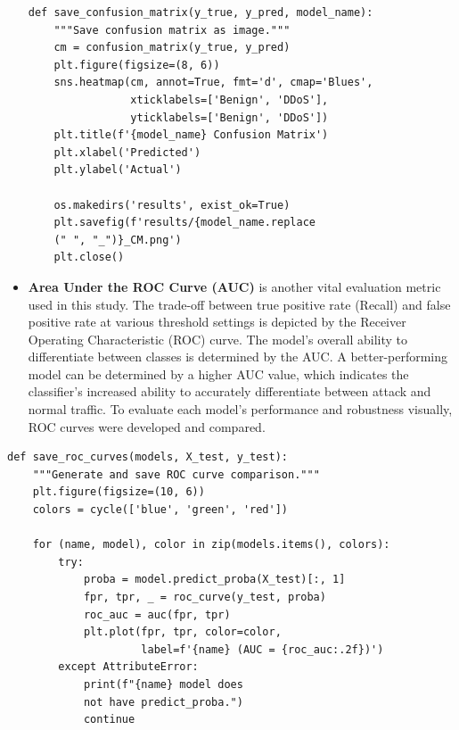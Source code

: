 \documentclass[conference]{IEEEtran}
\begin{document}
\begin{itemize}
\begin{center}
\begin{scriptsize}
\begin{verbatim}
def save_confusion_matrix(y_true, y_pred, model_name):
    """Save confusion matrix as image."""
    cm = confusion_matrix(y_true, y_pred)
    plt.figure(figsize=(8, 6))
    sns.heatmap(cm, annot=True, fmt='d', cmap='Blues',
                xticklabels=['Benign', 'DDoS'],
                yticklabels=['Benign', 'DDoS'])
    plt.title(f'{model_name} Confusion Matrix')
    plt.xlabel('Predicted')
    plt.ylabel('Actual')

    os.makedirs('results', exist_ok=True)
    plt.savefig(f'results/{model_name.replace
    (" ", "_")}_CM.png')
    plt.close()
\end{verbatim}
\end{scriptsize}
\end{center}


    \item \textbf{Area Under the ROC Curve (AUC)} is another vital evaluation metric used in this study. The trade-off between true positive rate (Recall) and false positive rate at various threshold settings is depicted by the Receiver Operating Characteristic (ROC) curve. The model's overall ability to differentiate between classes is determined by the AUC. A better-performing model can be determined by a higher AUC value, which indicates the classifier's increased ability to accurately differentiate between attack and normal traffic. To evaluate each model's performance and robustness visually, ROC curves were developed and compared.


\end{itemize}
    
\begin{center}
\begin{scriptsize}
\begin{verbatim}
def save_roc_curves(models, X_test, y_test):
    """Generate and save ROC curve comparison."""
    plt.figure(figsize=(10, 6))
    colors = cycle(['blue', 'green', 'red'])

    for (name, model), color in zip(models.items(), colors):
        try:
            proba = model.predict_proba(X_test)[:, 1]
            fpr, tpr, _ = roc_curve(y_test, proba)
            roc_auc = auc(fpr, tpr)
            plt.plot(fpr, tpr, color=color,
                     label=f'{name} (AUC = {roc_auc:.2f})')
        except AttributeError:
            print(f"{name} model does 
            not have predict_proba.")
            continue
\end{verbatim}
\end{scriptsize}
\end{center}
\end{document}

